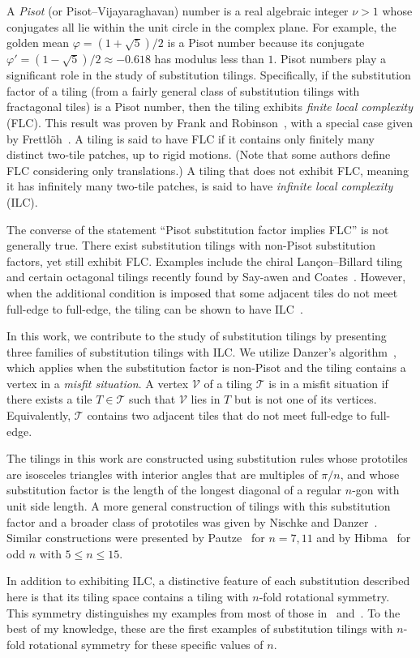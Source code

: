 
\noindent A \textit{Pisot} (or Pisot--Vijayaraghavan) number is a real algebraic integer \(\nu > 1\) whose conjugates all lie within the unit circle in the complex plane. For example, the golden mean \(\varphi = (1+\sqrt{5})/2\) is a Pisot number because its conjugate \(\varphi' = (1-\sqrt{5})/2 \approx -0.618\) has modulus less than \(1\). Pisot numbers play a significant role in the study of substitution tilings. Specifically, if the substitution factor of a tiling (from a fairly general class of substitution tilings with fractagonal tiles) is a Pisot number, then the tiling exhibits \textit{finite local complexity} (FLC). This result was proven by Frank and Robinson~\cite{FrankRob05}, with a special case given by Frettl\"oh~\cite{Fre02}. A tiling is said to have FLC if it contains only finitely many distinct two-tile patches, up to rigid motions. (Note that some authors define FLC considering only translations.) A tiling that does not exhibit FLC, meaning it has infinitely many two-tile patches, is said to have \textit{infinite local complexity} (ILC).

The converse of the statement “Pisot substitution factor implies FLC” is not generally true. There exist substitution tilings with non-Pisot substitution factors, yet still exhibit FLC. Examples include the chiral Lan\c{c}on--Billard tiling~\cite{LanBill88, BaaGri13} and certain octagonal tilings recently found by Say-awen and Coates~\cite{SayCo}. However, when the additional condition is imposed that some adjacent tiles do not meet full-edge to full-edge, the tiling can be shown to have ILC~\cite{Danz02, FrankRob05}.

In this work, we contribute to the study of substitution tilings by presenting three families of substitution tilings with ILC. We utilize Danzer’s algorithm~\cite{Danz02}, which applies when the substitution factor is non-Pisot and the tiling contains a vertex in a \textit{misfit situation}. A vertex \(\mathcal{V}\) of a tiling \(\mathcal{T}\) is in a misfit situation if there exists a tile \(T \in \mathcal{T}\) such that \(\mathcal{V}\) lies in \(T\) but is not one of its vertices. Equivalently, \(\mathcal{T}\) contains two adjacent tiles that do not meet full-edge to full-edge.

The tilings in this work are constructed using substitution rules whose prototiles are isosceles triangles with interior angles that are multiples of \(\pi/n\), and whose substitution factor is the length of the longest diagonal of a regular \(n\)-gon with unit side length. A more general construction of tilings with this substitution factor and a broader class of prototiles was given by Nischke and Danzer~\cite{NisDanz96}. Similar constructions were presented by Pautze~\cite{Pau17} for \(n = 7, 11\) and by Hibma~\cite{Hib15} for odd \(n\) with \(5 \leq n \leq 15\).

In addition to exhibiting ILC, a distinctive feature of each substitution described here is that its tiling space contains a tiling with \(n\)-fold rotational symmetry. This symmetry distinguishes my examples from most of those in~\cite{NisDanz96} and~\cite{Hib15}. To the best of my knowledge, these are the first examples of substitution tilings with \(n\)-fold rotational symmetry for these specific values of \(n\).
	
